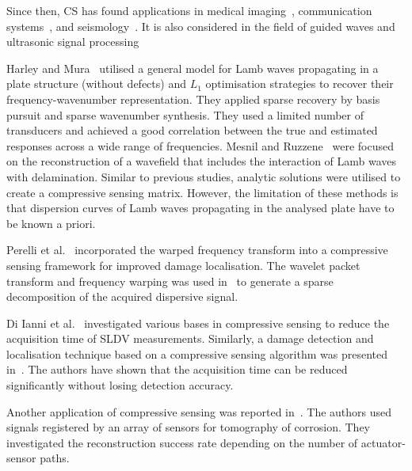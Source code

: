 Since then, CS has found applications in medical imaging~\cite{Lustig2007}, communication systems~\cite{Gao2018}, and seismology~\cite{Herrmann2012}.
It is also considered in the field of guided waves and ultrasonic signal processing~\cite{Harley2013,Mesnil2016,Perelli2012,Perelli2015,DiIanni2015,KeshmiriEsfandabadi2018,Chang2020}

Harley and Mura~\cite{Harley2013} utilised a general model for Lamb waves propagating in a plate structure (without defects) and $L_1$ optimisation strategies to recover their frequency-wavenumber representation. 
They applied sparse recovery by basis pursuit and sparse wavenumber synthesis.
They used a limited number of transducers and achieved a good correlation between the true and estimated responses across a wide range of frequencies.
Mesnil and Ruzzene~\cite{Mesnil2016} were focused on the reconstruction of a wavefield that includes the interaction of Lamb waves with delamination.
Similar to previous studies, analytic solutions were utilised to create a compressive sensing matrix.
However, the limitation of these methods is that dispersion curves of Lamb waves propagating in the analysed plate have to be known a priori.

Perelli et al.~\cite{Perelli2012} incorporated the warped frequency transform into a compressive sensing framework for improved damage localisation.
The wavelet packet transform and frequency warping was used in~\cite{Perelli2015} to generate a sparse decomposition of the acquired dispersive signal.

Di Ianni et al.~\cite{DiIanni2015} investigated various bases in compressive sensing to reduce the acquisition time of SLDV measurements.
Similarly, a damage detection and localisation technique based on a compressive sensing algorithm was presented in~\cite{KeshmiriEsfandabadi2018}.
The authors have shown that the acquisition time can be reduced significantly without losing detection accuracy.

Another application of compressive sensing was reported in~\cite{Chang2020}. 
The authors used signals registered by an array of sensors for tomography of corrosion.
They investigated the reconstruction success rate depending on the number of actuator-sensor paths.

